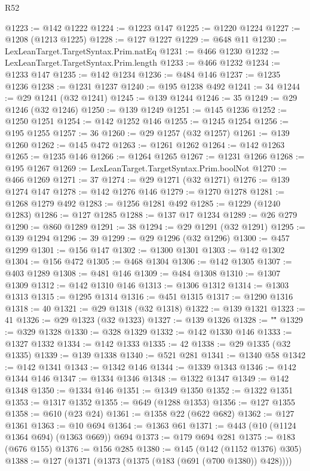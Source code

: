 \begin{lexlean}{R52}
\begin{coremodule}
@1223 := @142 @1222
@1224 := @1223 @147
@1225 := @1220 @1224
@1227 := @1208 (@1213 @1225)
@1228 := @127 @1227
@1229 := @648 @11
@1230 := LexLeanTarget.TargetSyntax.Prim.natEq
@1231 := @466 @1230
@1232 := LexLeanTarget.TargetSyntax.Prim.length
@1233 := @466 @1232
@1234 := @1233 @147
@1235 := @142 @1234
@1236 := @484 @146
@1237 := @1235 @1236
@1238 := @1231 @1237
@1240 := @195 @1238 @492
@1241 := 34
@1244 := @29 @1241 (@32 @1241)
@1245 := @139 @1244
@1246 := 35
@1249 := @29 @1246 (@32 @1246)
@1250 := @139 @1249
@1251 := @145 @1236
@1252 := @1250 @1251
@1254 := @142 @1252 @146
@1255 := @1245 @1254
@1256 := @195 @1255
@1257 := 36
@1260 := @29 @1257 (@32 @1257)
@1261 := @139 @1260
@1262 := @145 @472
@1263 := @1261 @1262
@1264 := @142 @1263
@1265 := @1235 @146
@1266 := @1264 @1265
@1267 := @1231 @1266
@1268 := @195 @1267
@1269 := LexLeanTarget.TargetSyntax.Prim.boolNot
@1270 := @466 @1269
@1271 := 37
@1274 := @29 @1271 (@32 @1271)
@1276 := @139 @1274 @147
@1278 := @142 @1276 @146
@1279 := @1270 @1278
@1281 := @1268 @1279 @492
@1283 := @1256 @1281 @492
@1285 := @1229 (@1240 @1283)
@1286 := @127 @1285
@1288 := @137 @17 @1234
@1289 := @26 @279
@1290 := @860 @1289
@1291 := 38
@1294 := @29 @1291 (@32 @1291)
@1295 := @139 @1294
@1296 := 39
@1299 := @29 @1296 (@32 @1296)
@1300 := @457 @1299
@1301 := @156 @147
@1302 := @1300 @1301
@1303 := @142 @1302
@1304 := @156 @472
@1305 := @468 @1304
@1306 := @142 @1305
@1307 := @403 @1289
@1308 := @481 @146
@1309 := @484 @1308
@1310 := @1307 @1309
@1312 := @142 @1310 @146
@1313 := @1306 @1312
@1314 := @1303 @1313
@1315 := @1295 @1314
@1316 := @451 @1315
@1317 := @1290 @1316
@1318 := 40
@1321 := @29 @1318 (@32 @1318)
@1322 := @139 @1321
@1323 := 41
@1326 := @29 @1323 (@32 @1323)
@1327 := @139 @1326
@1328 := "\""
@1329 := @329 @1328
@1330 := @328 @1329
@1332 := @142 @1330 @146
@1333 := @1327 @1332
@1334 := @142 @1333
@1335 := 42
@1338 := @29 @1335 (@32 @1335)
@1339 := @139 @1338
@1340 := @521 @281
@1341 := @1340 @58
@1342 := @142 @1341
@1343 := @1342 @146
@1344 := @1339 @1343
@1346 := @142 @1344 @146
@1347 := @1334 @1346
@1348 := @1322 @1347
@1349 := @142 @1348
@1350 := @1334 @146
@1351 := @1349 @1350
@1352 := @1322 @1351
@1353 := @1317 @1352
@1355 := @649 (@1288 @1353)
@1356 := @127 @1355
@1358 := @610 (@23 @24)
@1361 := @1358 @22 (@622 @682)
@1362 := @127 @1361
@1363 := @10 @694
@1364 := @1363 @61
@1371 := @443 (@10 (@1124 @1364 @694) (@1363 @669)) @694
@1373 := @179 @694 @281
@1375 := @183 (@676 @155)
@1376 := @156 @285
@1380 := @145 (@142 (@1152 @1376) @305)
@1388 := @127 (@1371 (@1373 (@1375 (@183 (@691 (@700 @1380)) @428))))

\end{coremodule}
\end{lexlean}
